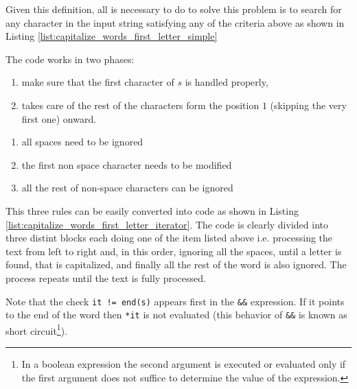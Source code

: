 Given this definition, all is necessary to do to solve this problem is to search for any character in the input string satisfying any of the criteria above as shown in Listing \ref{list:capitalize_words_first_letter_simple}



The code works in two phases:
\begin{enumerate}
	\item make sure that the first character of $s$ is handled properly,
	\item takes care of the rest of the characters form the position $1$ (skipping the very first one) onward.
\end{enumerate}





\begin{enumerate}
	\item  all spaces need to be ignored
    \item  the first non space character needs to be modified
    \item  all the rest of non-space characters can be ignored
\end{enumerate}

This three rules  can be easily converted into code as shown in Listing \ref{list:capitalize_words_first_letter_iterator}. The code is clearly divided into three distint blocks each doing one of the item listed above i.e. processing the text from left to right and, in this order, ignoring all the spaces, until a letter is found, that is capitalized, and finally all the rest of the word is also ignored. The process repeats until the text is fully processed. 



Note that the check \lstinline[columns=fixed]{it != end(s)} appears first in the \lstinline[columns=fixed]{&&} expression. If it points to the end of the word then \lstinline[columns=fixed]{*it} is not evaluated (this behavior of \lstinline[columns=fixed]{&&} is known as short circuit\footnote{In a boolean expression the second argument is executed or evaluated only if the first argument does not suffice to determine the value of the expression.}\cite{cit:wiki:shortcircuit}).

